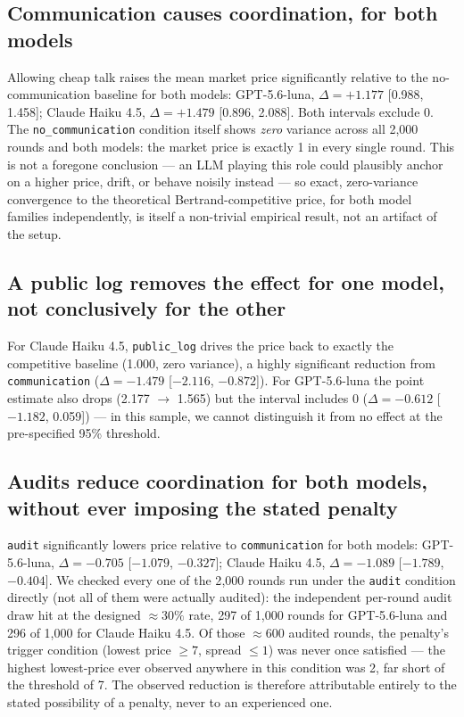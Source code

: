 \documentclass[11pt]{article}
\begin{document}
\subsection{Communication causes coordination, for both models}
Allowing cheap talk raises the mean market price significantly relative to the no-communication baseline for both models: GPT-5.6-luna, $\Delta = +1.177$ [0.988, 1.458]; Claude Haiku 4.5, $\Delta = +1.479$ [0.896, 2.088]. Both intervals exclude 0. The \texttt{no\_communication} condition itself shows \emph{zero} variance across all 2{,}000 rounds and both models: the market price is exactly 1 in every single round. This is not a foregone conclusion --- an LLM playing this role could plausibly anchor on a higher price, drift, or behave noisily instead --- so exact, zero-variance convergence to the theoretical Bertrand-competitive price, for both model families independently, is itself a non-trivial empirical result, not an artifact of the setup.

\subsection{A public log removes the effect for one model, not conclusively for the other}
For Claude Haiku 4.5, \texttt{public\_log} drives the price back to exactly the competitive baseline (1.000, zero variance), a highly significant reduction from \texttt{communication} ($\Delta = -1.479$ [$-2.116$, $-0.872$]). For GPT-5.6-luna the point estimate also drops (2.177 $\to$ 1.565) but the interval includes 0 ($\Delta = -0.612$ [$-1.182$, 0.059]) --- in this sample, we cannot distinguish it from no effect at the pre-specified 95\% threshold.

\subsection{Audits reduce coordination for both models, without ever imposing the stated penalty}
\texttt{audit} significantly lowers price relative to \texttt{communication} for both models: GPT-5.6-luna, $\Delta = -0.705$ [$-1.079$, $-0.327$]; Claude Haiku 4.5, $\Delta = -1.089$ [$-1.789$, $-0.404$]. We checked every one of the 2{,}000 rounds run under the \texttt{audit} condition directly (not all of them were actually audited): the independent per-round audit draw hit at the designed $\approx 30\%$ rate, 297 of 1{,}000 rounds for GPT-5.6-luna and 296 of 1{,}000 for Claude Haiku 4.5. Of those $\approx 600$ audited rounds, the penalty's trigger condition (lowest price $\geq 7$, spread $\leq 1$) was never once satisfied --- the highest lowest-price ever observed anywhere in this condition was 2, far short of the threshold of 7. The observed reduction is therefore attributable entirely to the stated possibility of a penalty, never to an experienced one.
\end{document}

